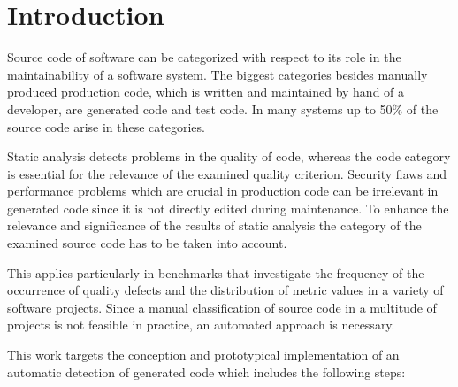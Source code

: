 
\chapter{Introduction}\label{chapter:introduction}

Source code of software can be categorized with respect to its role in the maintainability of a software system. The biggest categories besides manually produced production code, which is written and maintained by hand of a developer, are generated code and test code. In many systems up to 50\% of the source code arise in these categories.

Static analysis detects problems in the quality of code, whereas the code category is essential for the relevance of the examined quality criterion. Security flaws and performance problems which are crucial in production code can be irrelevant in generated code since it is not directly edited during maintenance. To enhance the relevance and significance of the results of static analysis the category of the examined source code has to be taken into account.

This applies particularly in benchmarks that investigate the frequency of the occurrence of quality defects and the distribution of metric values in a variety of software projects. Since a manual classification of source code in a multitude of projects is not feasible in practice, an automated approach is necessary.

This work targets the conception and prototypical implementation of an automatic detection of generated code which includes the following steps:

